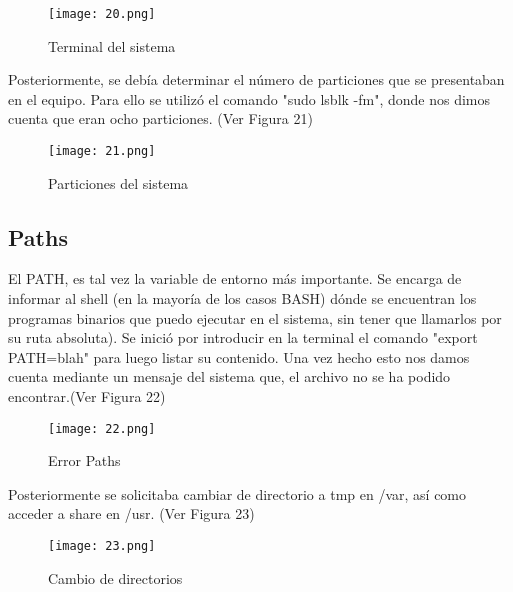 \documentclass[
  letterpaper, 
  maincolor=black,
  sectioncolor=black!90,
  subsectioncolor=black!70,
  itemtextcolor=black!40,
]{fortysecondscv}
\begin{document}
\begin{center}
    \begin{figure}[H]
    \centering
    \texttt{[image: 20.png]}
    \caption{Terminal del sistema}
    \label{fig:10.png}
    \end{figure}
\end{center}

{Posteriormente, se debía determinar el número de particiones que se presentaban en el equipo. Para ello se utilizó el comando "sudo lsblk -fm", donde nos dimos cuenta que eran ocho particiones. (Ver Figura 21)}

\begin{center}
    \begin{figure}[H]
    \centering
    \texttt{[image: 21.png]}
    \caption{Particiones del sistema}
    \label{fig:10.png}
    \end{figure}
\end{center}

\subsection{Paths}
{El PATH, es tal vez la variable de entorno más importante. Se encarga de informar al shell (en la mayoría de los casos BASH) dónde se encuentran los programas binarios que puedo ejecutar en el sistema, sin tener que llamarlos por su ruta absoluta).}
{Se inició por introducir en la terminal el comando "export PATH=blah" para luego listar su contenido. Una vez hecho esto nos damos cuenta mediante un mensaje del sistema que, el archivo no se ha podido encontrar.(Ver Figura 22)}

\begin{center}
    \begin{figure}[H]
    \centering
    \texttt{[image: 22.png]}
    \caption{Error Paths}
    \label{fig:10.png}
    \end{figure}
\end{center}

{Posteriormente se solicitaba cambiar de directorio a tmp en /var, así como acceder a share en /usr. (Ver Figura 23)}

\begin{center}
    \begin{figure}[H]
    \centering
    \texttt{[image: 23.png]}
    \caption{Cambio de directorios}
    \label{fig:10.png}
    \end{figure}
\end{center}
\end{document}
